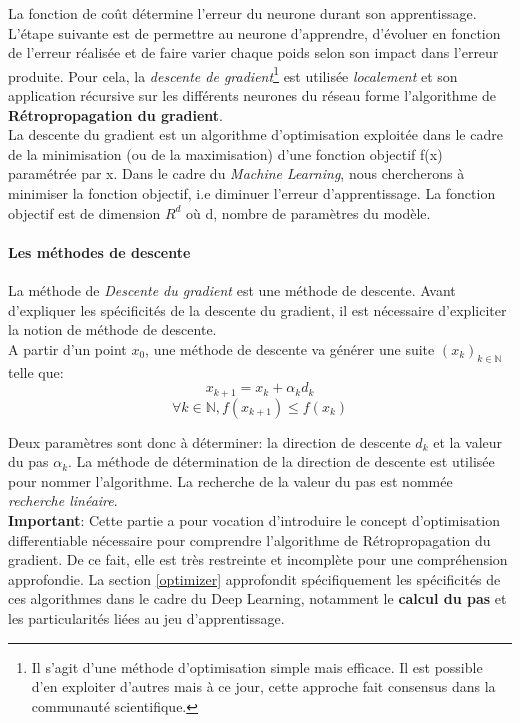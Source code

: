 La fonction de coût détermine l'erreur du neurone durant son apprentissage. L'étape suivante est de permettre au neurone d'apprendre, d'évoluer en fonction de l'erreur réalisée et de faire varier chaque poids selon son impact dans l'erreur produite. Pour cela, la \textit{descente de gradient}\footnote{Il s'agit d'une méthode d'optimisation simple mais efficace. Il est possible d'en exploiter d'autres mais à ce jour, cette approche fait consensus dans la communauté scientifique.} est utilisée \textit{localement} et son application récursive sur les différents neurones du réseau forme l'algorithme de \textbf{Rétropropagation du gradient}. \\

\noindent La descente du gradient est un algorithme d'optimisation exploitée dans le cadre de la minimisation (ou de la maximisation) d'une fonction objectif f(x) paramétrée par x. Dans le cadre du \textit{Machine Learning}, nous chercherons à minimiser la fonction objectif, i.e diminuer l'erreur d'apprentissage. La fonction objectif est de dimension $R^d$ où d, nombre de paramètres du modèle.\\

\paragraph{Les méthodes de descente}
La méthode de \textit{Descente du gradient} est une méthode de descente. Avant d'expliquer les spécificités de la descente du gradient, il est nécessaire d'expliciter la notion de méthode de descente.\\

\noindent A partir d'un point $x_0$, une méthode de descente va générer une suite $(x_k)_{k \in \mathbb{N}}$ telle que:
$$x_{k+1}=x_k+\alpha_kd_k$$
$$\forall k \in \mathbb{N}, f(x_{k+1})\leq f(x_k)$$

\noindent Deux paramètres sont donc à déterminer: la direction de descente $d_k$ et la valeur du pas $\alpha_k$. La méthode de détermination de la direction de descente est utilisée pour nommer l'algorithme. La recherche de la valeur du pas est nommée \textit{recherche linéaire}.\\

\noindent \textbf{Important}: Cette partie a pour vocation d'introduire le concept d'optimisation differentiable nécessaire pour comprendre l'algorithme de Rétropropagation du gradient. De ce fait, elle est très restreinte et incomplète pour une compréhension approfondie. La section \ref{optimizer} approfondit spécifiquement les spécificités de ces algorithmes dans le cadre du Deep Learning, notamment le \textbf{calcul du pas} et les particularités liées au jeu d'apprentissage.

